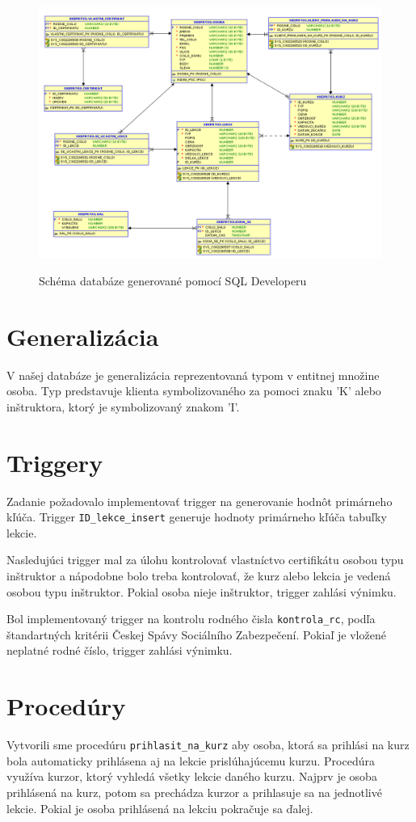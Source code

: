 \documentclass[11pt]{article}
\begin{document}
\begin{figure}[ht]
    \caption{Schéma databáze generované pomocí SQL Developeru}    
    \includegraphics[scale=.538]{schema_DB.png}    
    \label{lopata}
\end{figure}
\restoregeometry

\section{Generalizácia}
V našej databáze je generalizácia reprezentovaná typom v entitnej množine osoba.
Typ predstavuje klienta symbolizovaného za pomoci znaku 'K' alebo inštruktora, ktorý je symbolizovaný
znakom 'I'. 

\section{Triggery}
Zadanie požadovalo implementovať trigger na generovanie hodnôt primárneho kľúča.
Trigger \texttt{ID\_lekce\_insert} generuje hodnoty primárneho kľúča tabuľky lekcie.

Nasledujúci trigger mal za úlohu kontrolovať vlastníctvo certifikátu osobou typu inštruktor a nápodobne bolo
treba kontrolovať, že kurz alebo lekcia je vedená osobou typu inštruktor. Pokial osoba
nieje inštruktor, trigger zahlási výnimku. 

Bol implementovaný trigger na kontrolu rodného čisla \texttt{kontrola\_rc}, podľa štandartných kritérii Českej Spávy Sociálního 
Zabezpečení. Pokiaľ je vložené neplatné rodné číslo, trigger zahlási výnimku. 

\section{Procedúry}
Vytvorili sme procedúru \texttt{prihlasit\_na\_kurz} aby osoba, ktorá sa prihlási na kurz bola automaticky
prihlásena aj na lekcie prislúhajúcemu kurzu. Procedúra využíva kurzor, ktorý vyhledá všetky lekcie daného kurzu.
Najprv je osoba prihlásená na kurz, potom sa prechádza kurzor a prihlasuje sa na jednotlivé lekcie. Pokial je osoba
prihlásená na lekciu pokračuje sa ďalej.
\end{document}
